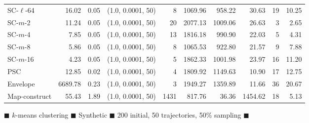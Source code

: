 \begin{figure}
\begin{center}
\begin{minipage}{\textwidth}
{\begin{tabular}{@{}lrrcrrrrrr@{}}
        SC-$\ell$-64 & 16.02 & 0.05 & (1.0, 0.0001, 50) & 8 & 1069.96 & 958.22 & 30.63 & 19 & 10.25\\
        SC-$m$-2 & 11.24 & 0.05 & (1.0, 0.0001, 50) & 20 & 2077.13 & 1009.06 & 26.63 & 3 & 2.65\\
        SC-$m$-4 & 7.85 & 0.05 & (1.0, 0.0001, 50) & 13 & 1816.18 & 990.90 & 22.03 & 5 & 4.31\\
        SC-$m$-8 & 5.86 & 0.05 & (1.0, 0.0001, 50) & 8 & 1065.53 & 922.80 & 21.57 & 9 & 7.88\\
        SC-$m$-16 & 4.23 & 0.05 & (1.0, 0.0001, 50) & 5 & 1862.33 & 1001.98 & 23.97 & 16 & 11.20\\
        PSC & 12.85 & 0.02 & (1.0, 0.0001, 50) & 4 & 1809.92 & 1149.63 & 10.90 & 17 & 12.75\\
        Envelope & 6689.78 & 0.23 & (1.0, 0.0001, 50) & 3 & 1949.27 & 1359.89 & 11.66 & 36 & 20.67\\
        Map-construct & 55.43 & 1.89 & (1.0, 0.0001, 50) & 1431 & 817.76 & 36.36 & 1454.62 & 18 & 5.13\\
        \bottomrule
    \end{tabular}
    }
  \end{minipage}
  \end{center}
        \caption{
        $\blacksquare$ $k$-means clustering $\blacksquare$ Synthetic $\blacksquare$ 200 initial, 50 trajectories, 50\% sampling $\blacksquare$}
 \end{figure}
\clearpage
\newpage 
%
\clearpage

